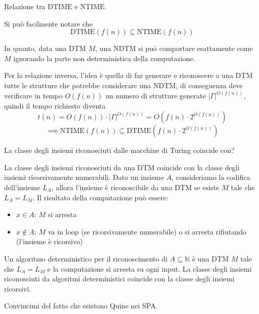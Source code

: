 \documentclass[12pt, answers]{exam}
\theoremstyle{plain}
\newcommand{\dtime}{\text{DTIME}}
\newcommand{\ntime}{\text{NTIME}}
\newcommand{\N}{\mathbb{N}}
\begin{document}
\begin{questions}
        \question Relazione tra $\dtime$ e $\ntime$.
        
        \begin{solution}
            Si può facilmente notare che 
            $$ \dtime \left(f(n)\right) \subseteq \ntime \left(f(n) \right) $$
            
            In quanto, data una DTM $M$, una NDTM si può comportare esattamente come $M$ ignorando la parte non deterministica della computazione.
            
            Per la relazione inversa, l'idea è quella di far generare e riconoscere a una DTM tutte le strutture che potrebbe considerare una NDTM, di conseguenza deve verificare in tempo $O(f(n))$ un numero di strutture generate $|\Gamma|^{O(f(n))}$, quindi il tempo richiesto diventa
            $$ t(n) = O(f(n)) \cdot |\Gamma|^{O(f(n))} = O\left(f(n) \cdot 2^{O(f(n))}\right) $$
            $$ \implies \ntime(f(n)) \subseteq \dtime \left(f(n) \cdot 2^{O(f(n))}\right) $$
        \end{solution}
        
        \question La classe degli insiemi riconosciuti dalle macchine di Turing coincide con?
        
        \begin{solution}
            La classe degli insiemi riconosciuti da una DTM coincide con la classe degli insiemi ricorsivamente numerabili. Dato un insieme $A$, consideriamo la codifica dell'insieme $L_A$, allora l'insieme è riconoscibile da una DTM se esiste $M$ tale che $L_A = L_M$. Il risultato della computazione può essere: 
            \begin{itemize}
                \item $x \in A$: $M$ si arresta
                
                \item $x \notin A$: $M$ va in loop (se ricorsivamente numerabile) o si arresta rifiutando (l'insieme è ricorsivo)
            \end{itemize} 
            
            Un algoritmo deterministico per il riconoscimento di $A \subseteq \N$ è una DTM $M$ tale che $L_A = L_M$ e la computazione si arresta su ogni input. La classe degli insiemi riconosciuti da algoritmi deterministici coincide con la classe degli insiemi ricorsivi.
        \end{solution}
        
        \question Convincimi del fatto che esistono Quine nei SPA.
        

\end{questions}
\end{document}
